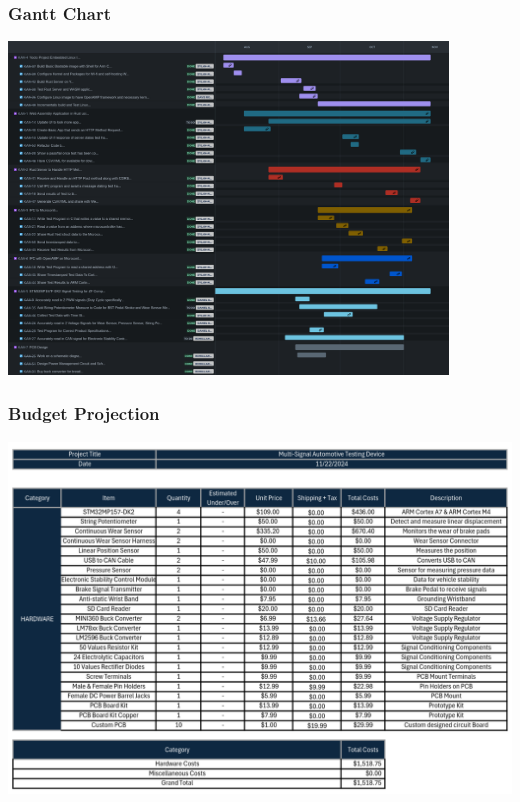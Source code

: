 \documentclass[8pt,compress]{beamer}
\begin{document}
\begin{frame}
  \frametitle{Gantt Chart}
  \includegraphics[width=0.875\textwidth]{assets/diagrams/gantt.png}
\end{frame}
\begin{frame}
  \frametitle{Budget Projection}
  \vspace{-.2025cm}
  \includegraphics[height=0.675\textwidth]{assets/diagrams/budget.png}
\end{frame}
\end{document}
